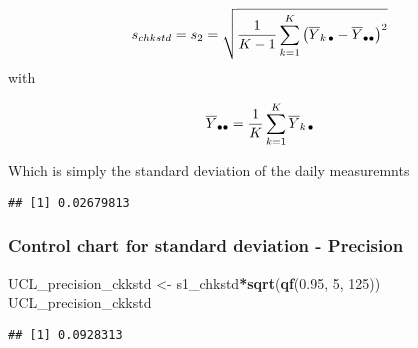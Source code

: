 \documentclass[]{book}
\newenvironment{Shaded}{\begin{snugshade}}{\end{snugshade}}
\newcommand{\DecValTok}[1]{\textcolor[rgb]{0.00,0.00,0.81}{#1}}
\newcommand{\FloatTok}[1]{\textcolor[rgb]{0.00,0.00,0.81}{#1}}
\newcommand{\KeywordTok}[1]{\textcolor[rgb]{0.13,0.29,0.53}{\textbf{#1}}}
\newcommand{\NormalTok}[1]{#1}
\newcommand{\OperatorTok}[1]{\textcolor[rgb]{0.81,0.36,0.00}{\textbf{#1}}}
\newcommand{\StringTok}[1]{\textcolor[rgb]{0.31,0.60,0.02}{#1}}
\theoremstyle{definition}
\theoremstyle{definition}
\theoremstyle{definition}
\theoremstyle{remark}
\begin{document}
\[
s_{chkstd} = {\large s}_2 = \sqrt{\frac{1}{K-1} \sum_{k=1}^{K} \left( \overline{Y}_{k \, \small{\bullet}} - \overline{Y}_{\small{\bullet}  \small{\bullet}} \right) ^2}
\] with

\[
\overline{Y}_{\small{\bullet} \small{\bullet}}  = \frac{1}{K} \sum_{k=1}^{K} \overline{Y}_{k \, \small{\bullet}}
\]

Which is simply the standard deviation of the daily measuremnts

\begin{Shaded}
\end{Shaded}

\begin{verbatim}
## [1] 0.02679813
\end{verbatim}

\hypertarget{control-chart-for-standard-deviation---precision}{%
\subsubsection{Control chart for standard deviation -
Precision}\label{control-chart-for-standard-deviation---precision}}

\begin{Shaded}
\begin{Highlighting}[]
\NormalTok{UCL_precision_ckkstd <-}\StringTok{ }\NormalTok{s1_chkstd}\OperatorTok{*}\KeywordTok{sqrt}\NormalTok{(}\KeywordTok{qf}\NormalTok{(}\FloatTok{0.95}\NormalTok{, }\DecValTok{5}\NormalTok{, }\DecValTok{125}\NormalTok{))}
\NormalTok{UCL_precision_ckkstd}
\end{Highlighting}
\end{Shaded}

\begin{verbatim}
## [1] 0.0928313
\end{verbatim}
\end{document}
